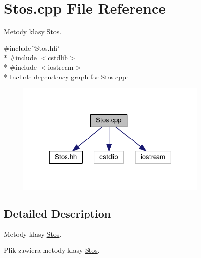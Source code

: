 \hypertarget{a00018}{}\section{Stos.\+cpp File Reference}
\label{a00018}


Metody klasy \hyperlink{a00006}{Stos}.  


{\ttfamily \#include \char`\"{}Stos.\+hh\char`\"{}}\\*
{\ttfamily \#include $<$cstdlib$>$}\\*
{\ttfamily \#include $<$iostream$>$}\\*
Include dependency graph for Stos.\+cpp\+:\nopagebreak
\begin{figure}[H]
\begin{center}
\leavevmode
\includegraphics[width=266pt]{a00036}
\end{center}
\end{figure}


\subsection{Detailed Description}
Metody klasy \hyperlink{a00006}{Stos}. 

Plik zawiera metody klasy \hyperlink{a00006}{Stos}. 